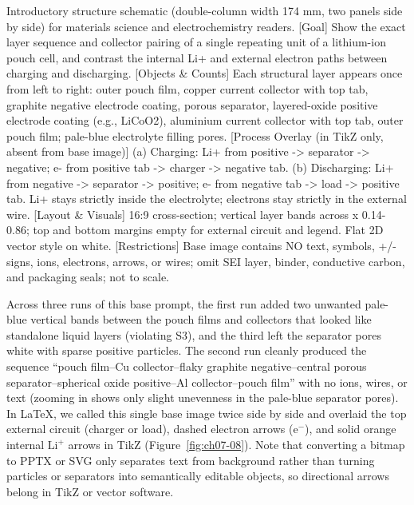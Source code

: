 \begin{Prompt}
 Introductory structure schematic (double-column width 174 mm, two
panels side by side) for materials science and electrochemistry readers.
[Goal] Show the exact layer sequence and collector pairing of a single repeating unit of
a lithium-ion pouch cell, and contrast the internal Li+ and external electron paths
between charging and discharging.
[Objects & Counts] Each structural layer appears once from left to right: outer pouch
film, copper current collector with top tab, graphite negative electrode coating,
porous separator, layered-oxide positive electrode coating (e.g., LiCoO2), aluminium
current collector with top tab, outer pouch film; pale-blue electrolyte filling pores.
[Process Overlay (in TikZ only, absent from base image)]
(a) Charging: Li+ from positive -> separator -> negative; e- from positive tab -> charger -> negative tab.
(b) Discharging: Li+ from negative -> separator -> positive; e- from negative tab -> load -> positive tab.
Li+ stays strictly inside the electrolyte; electrons stay strictly in the external wire.
[Layout & Visuals] 16:9 cross-section; vertical layer bands across x 0.14-0.86; top and
bottom margins empty for external circuit and legend. Flat 2D vector style on white.
[Restrictions] Base image contains NO text, symbols, +/- signs, ions, electrons, arrows,
or wires; omit SEI layer, binder, conductive carbon, and packaging seals; not to scale.
\end{Prompt}

Across three runs of this base prompt, the first run added two unwanted pale-blue vertical bands between the pouch films and collectors that looked like standalone liquid layers (violating S3), and the third left the separator pores white with sparse positive particles. The second run cleanly produced the sequence ``pouch film--Cu collector--flaky graphite negative--central porous separator--spherical oxide positive--Al collector--pouch film'' with no ions, wires, or text (zooming in shows only slight unevenness in the pale-blue separator pores). In LaTeX, we called this single base image twice side by side and overlaid the top external circuit (charger or load), dashed electron arrows ($\text{e}^-$), and solid orange internal $\text{Li}^+$ arrows in TikZ (Figure~\ref{fig:ch07-08}). Note that converting a bitmap to PPTX or SVG only separates text from background rather than turning particles or separators into semantically editable objects, so directional arrows belong in TikZ or vector software.

